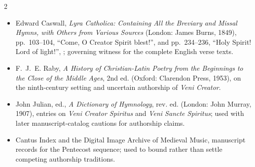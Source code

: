 \begin{multicols}{2}
\begin{itemize}
\item Edward Caswall, \textit{Lyra Catholica: Containing All the Breviary and Missal Hymns, with Others from Various Sources} (London: James Burns, 1849), pp.~103--104, “Come, O Creator Spirit blest!”, and pp.~234--236, “Holy Spirit! Lord of light!”, ; governing witness for the complete English verse texts.
\item F.~J.~E. Raby, \textit{A History of Christian-Latin Poetry from the Beginnings to the Close of the Middle Ages}, 2nd ed. (Oxford: Clarendon Press, 1953), on the ninth-century setting and uncertain authorship of \textit{Veni Creator}.
\item John Julian, ed., \textit{A Dictionary of Hymnology}, rev. ed. (London: John Murray, 1907), entries on \textit{Veni Creator Spiritus} and \textit{Veni Sancte Spiritus}; used with later manuscript-catalog cautions for authorship claims.
\item Cantus Index and the Digital Image Archive of Medieval Music, manuscript records for the Pentecost sequence; used to bound rather than settle competing authorship traditions.
\end{itemize}

\end{multicols}
